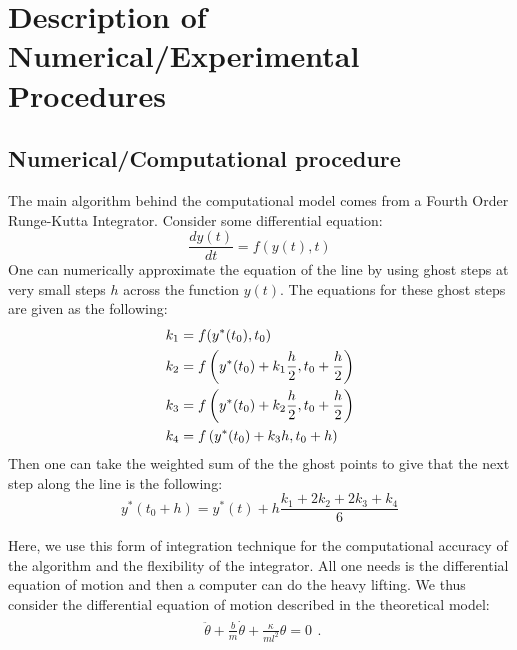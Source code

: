 \section{Description of Numerical/Experimental Procedures} \label{sec:Description of Numerical/Experimental Procedures}
    \subsection{Numerical/Computational procedure}
            \par{} The main algorithm behind the computational model comes from a Fourth Order Runge-Kutta Integrator. Consider some differential equation:
        \begin{equation}
            \frac{dy(t)}{dt} = f(y(t),t)
        \end{equation}
            One can numerically approximate the equation of the line by using ghost steps at very small steps $h$ across the function $y(t)$. The equations for these ghost steps are given as the following:
        \begin{align} 
            & {k_1} = f({y^*}({t_0}),{t_0})  \\  
            & {k_2} = f\left( {{y^*}({t_0}) + {k_1}{h \over 2},{t_0} + {h \over 2}} \right)  \\
            & {k_3} = f\left( {{y^*}({t_0}) + {k_2}{h \over 2},{t_0} + {h \over 2}} \right)  \\  
            & {k_4} = f\left( {{y^*}({t_0}) + {k_3}h,{t_0} + h} \right)
        \end{align}
        Then one can take the weighted sum of the the ghost points to give that the next step along the line is the following:
        \begin{equation}
            {y^*}(t_0 + h) = {y^*}(t) + h\frac{k_1 + 2k_2 + 2k_3 + k_4}{6}
        \end{equation}
        \par{} Here, we use this form of integration technique for the computational accuracy of the algorithm and the flexibility of the integrator. All one needs is the differential equation of motion and then a computer can do the heavy lifting. We thus consider the differential equation of motion described in the theoretical model:
        \begin{eqnarray}
            \begin{split}
                \ddot\theta+\frac{b}{m}\dot\theta+\frac{\kappa}{ml^{2}}\theta=0
            \end{split}.
        \end{eqnarray}
